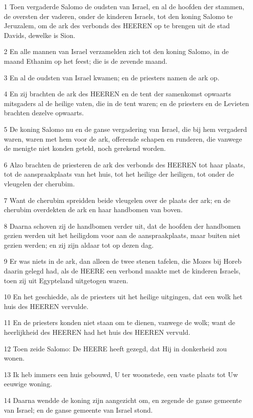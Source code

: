 \par 1 Toen vergaderde Salomo de oudsten van Israel, en al de hoofden der stammen, de oversten der vaderen, onder de kinderen Israels, tot den koning Salomo te Jeruzalem, om de ark des verbonds des HEEREN op te brengen uit de stad Davids, dewelke is Sion.
\par 2 En alle mannen van Israel verzamelden zich tot den koning Salomo, in de maand Ethanim op het feest; die is de zevende maand.
\par 3 En al de oudsten van Israel kwamen; en de priesters namen de ark op.
\par 4 En zij brachten de ark des HEEREN en de tent der samenkomst opwaarts mitsgaders al de heilige vaten, die in de tent waren; en de priesters en de Levieten brachten dezelve opwaarts.
\par 5 De koning Salomo nu en de ganse vergadering van Israel, die bij hem vergaderd waren, waren met hem voor de ark, offerende schapen en runderen, die vanwege de menigte niet konden geteld, noch gerekend worden.
\par 6 Alzo brachten de priesteren de ark des verbonds des HEEREN tot haar plaats, tot de aanspraakplaats van het huis, tot het heilige der heiligen, tot onder de vleugelen der cherubim.
\par 7 Want de cherubim spreidden beide vleugelen over de plaats der ark; en de cherubim overdekten de ark en haar handbomen van boven.
\par 8 Daarna schoven zij de handbomen verder uit, dat de hoofden der handbomen gezien werden uit het heiligdom voor aan de aanspraakplaats, maar buiten niet gezien werden; en zij zijn aldaar tot op dezen dag.
\par 9 Er was niets in de ark, dan alleen de twee stenen tafelen, die Mozes bij Horeb daarin gelegd had, als de HEERE een verbond maakte met de kinderen Israels, toen zij uit Egypteland uitgetogen waren.
\par 10 En het geschiedde, als de priesters uit het heilige uitgingen, dat een wolk het huis des HEEREN vervulde.
\par 11 En de priesters konden niet staan om te dienen, vanwege de wolk; want de heerlijkheid des HEEREN had het huis des HEEREN vervuld.
\par 12 Toen zeide Salomo: De HEERE heeft gezegd, dat Hij in donkerheid zou wonen.
\par 13 Ik heb immers een huis gebouwd, U ter woonstede, een vaste plaats tot Uw eeuwige woning.
\par 14 Daarna wendde de koning zijn aangezicht om, en zegende de ganse gemeente van Israel; en de ganse gemeente van Israel stond.
